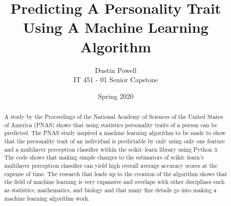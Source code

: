 \documentclass[a4paper, 12pt]{article}
\title{Predicting  A Personality Trait Using A Machine Learning Algorithm}
\date{Spring 2020}
\author{Dustin Powell \\IT 451 - 01 Senior Capstone}
\begin{document}

\newtheorem*{theorem}{Primary Question}
\maketitle

\begin{abstract}
A study by the Proceedings of the National Academy of Sciences of the United States of America (PNAS) shows that using statistics personality traits of a person can be predicted. The PNAS study inspired a machine learning algorithm to be made to show that the personality trait of an individual is predictable by only using only one feature and a multilayer perceptron classifier within the scikit--learn library using Python 3. The code shows that making simple changes to the estimators of scikit--learn's multilayer perceptron classifier can yield high overall average accuracy scores at the expense of time.  The research that leads up to the creation of the algorithm shows that the field of machine learning is very expansive and overlaps with other disciplines such as statistics, mathematics, and biology and that many fine details go into making a machine learning algorithm work.
\end{abstract}
\newpage

\tableofcontents
\newpage


\setcounter{page}{1}
\end{document}

